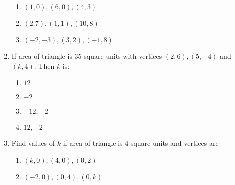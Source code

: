 \begin{enumerate}[label=\thesubsection.\arabic*,ref=\thesubsection.\theenumi]
\begin{enumerate}
\item $(1,0), (6,0), (4,3)$
\item $(2.7), (1,1), (10,8)$
\item $(-2,-3), (3,2), (-1,8)$
\end{enumerate}
\item If area of triangle is 35 square units with vertices $(2,6), (5,-4)$ and $(k,4)$. Then $k$ is:
\begin{enumerate}
\item $12$
\item $-2$
\item $-12,-2$
\item $12, -2$
\end{enumerate}
\item Find values of $k$ if area of triangle is 4 square units and vertices are
\begin{enumerate}
\item $(k,0), (4,0), (0,2)$
\item $(-2,0), (0,4), (0,k)$
\end{enumerate}
\end{enumerate}

